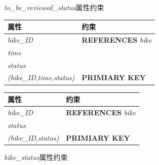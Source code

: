 \begin{figure}[!htp]
    \begin{minipage}{0.5\textwidth}
      \centering
      \caption{\textit{to\_be\_reviewed\_status}属性约束}
      \label{contraint:tobereviewedstatus}
      \begin{tabular}{ll}\toprule
        属性&约束\\\midrule
       \textit{bike\_ID}&\textbf{REFERENCES} \textit{bike}\\
       \textit{time}&\\
       \textit{status}&\\
       \textit{(bike\_ID,time,status)}&\textbf{PRIMIARY KEY}\\
       \bottomrule
      \end{tabular}
    \end{minipage}\hfill
    \begin{minipage}{0.5\textwidth}
      \centering
      \caption{\textit{bike\_status}属性约束}
      \label{contraint:bikestatus}
      \begin{tabular}{ll}\toprule
        属性&约束\\\midrule
       \textit{bike\_ID}&\textbf{REFERENCES} \textit{bike}\\
       \textit{status}&\\
       \textit{(bike\_ID,status)}&\textbf{PRIMIARY KEY}\\
       \bottomrule
      \end{tabular}
    \end{minipage}\hfill
 \end{figure}

